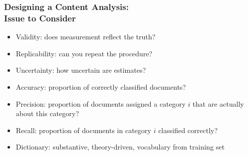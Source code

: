 \documentclass[11pt,compress,professionalfonts]{beamer}
\newcommand{\ita}{\begin{itemize}}
\newcommand{\itm}{\item[]}
\newcommand{\itz}{\end{itemize}}
\begin{document}
\begin{frame}[t,fragile]

\end{frame}
\begin{frame}[t,fragile]\frametitle{Designing a Content Analysis:\\Issue to Consider}

\ita

\itm Validity: does measurement reflect the truth?
\itm Replicability: can you repeat the procedure?
\itm Uncertainty: how uncertain are estimates?
\itm Accuracy: proportion of correctly classified documents?
\itm Precision: proportion of documents assigned a category $i$ that are actually about this category?
\itm Recall: proportion of documents in category $i$ classified correctly?
\itm Dictionary: substantive, theory-driven, vocabulary from training set
\itz

\end{frame}
\end{document}
